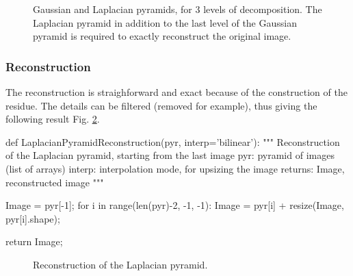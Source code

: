 \begin{figure}[htbp]
\centering\caption{Gaussian and Laplacian pyramids, for 3 levels of decomposition. The Laplacian pyramid in addition to the last level of the Gaussian pyramid is required to exactly reconstruct the original image.}%
 
 \hfill
 \hfill

 \hfill
 \hfill
 \label{fig:multiscale:python:glpyramid}%
\end{figure}

\subsubsection{Reconstruction}
The reconstruction is straighforward and exact because of the construction of the residue. The details can be filtered (removed for example), thus giving the following result Fig. \ref{fig:multiscale:python:nodetails}.

\begin{python}
def LaplacianPyramidReconstruction(pyr, interp='bilinear'):
    """
    Reconstruction of the Laplacian pyramid, starting from the last image
    pyr: pyramid of images (list of arrays)
    interp: interpolation mode, for upsizing the image
    returns: Image, reconstructed image
    """
    
    Image = pyr[-1];
    for i in range(len(pyr)-2, -1, -1):
        Image = pyr[i] + resize(Image, pyr[i].shape);
        
    return Image;
\end{python}

\begin{figure}[htbp]
\centering\caption{Reconstruction of the Laplacian pyramid.}%
 \hfill
 \label{fig:multiscale:python:nodetails}
\end{figure}


